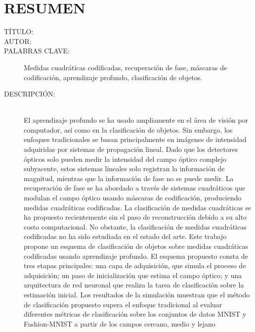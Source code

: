 \chapter*{RESUMEN}

\footnotesize{
\begin{description}
  \item[TÍTULO:] \MakeUppercase{\titulo}
  \item[AUTOR:]\MakeUppercase{\autor} 
  \item[PALABRAS CLAVE:] Medidas cuadráticas codificadas, recuperación de fase, máscaras de codificación, aprendizaje profundo, clasificación de objetos.
  \item[DESCRIPCIÓN:]\hfill \\ El aprendizaje profundo se ha usado ampliamente en el área de visión por computador, así como en la clasificación de objetos. Sin embargo, los enfoques tradicionales se basan principalmente en imágenes de intensidad adquiridas por sistemas de propagación lineal. Dado que los detectores ópticos solo pueden medir la intensidad del campo óptico complejo subyacente, estos sistemas lineales solo registran la información de magnitud, mientras que la información de fase no se puede medir. La recuperación de fase se ha abordado a través de sistemas cuadráticos que modulan el campo óptico usando máscaras de codificación, produciendo medidas cuadráticas codificadas. La clasificación de medidas cuadráticas se ha propuesto recientemente sin el paso de reconstrucción debido a su alto costo computacional. No obstante, la clasificación de medidas cuadráticas codificadas no ha sido estudiada en el estado del arte. Este trabajo propone un esquema de clasificación de objetos sobre medidas cuadráticas codificadas usando aprendizaje profundo. El esquema propuesto consta de tres etapas principales: una capa de adquisición, que simula el proceso de adquisición; un paso de inicialización que estima el campo óptico; y una arquitectura de red neuronal que realiza la tarea de clasificación sobre la estimación inicial. Los resultados de la simulación muestran que el método de clasificación propuesto supera el enfoque tradicional al evaluar diferentes métricas de clasificación sobre los conjuntos de datos MNIST y Fashion-MNIST a partir de los campos cercano, medio y lejano
\end{description}}\normalsize
